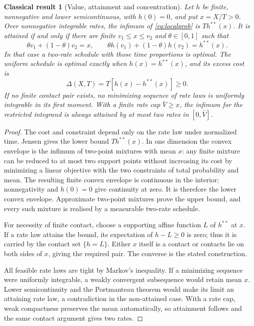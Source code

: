 \documentclass[11pt]{article}
\numberwithin{equation}{section}
\newtheorem{classical}[theorem]{Classical result}
\theoremstyle{definition}
\theoremstyle{remark}
\theoremstyle{definition}
\begin{document}
\begin{classical}[Value, attainment and concentration]\label{thm:relaxation}
Let $h$ be finite, nonnegative and lower semicontinuous, with $h(0)=0$,
and put $x=X/T>0$. Over nonnegative integrable rates, the infimum of
\eqref{eq:localprob} is $Th^{**}(x)$. It is attained if and only if there
are finite $v_1\le x\le v_2$ and $\theta\in[0,1]$ such that
\[
 \theta v_1+(1-\theta)v_2=x,\qquad
 \theta h(v_1)+(1-\theta)h(v_2)=h^{**}(x).
\]
In that case a two-rate schedule with those time proportions is optimal.
The uniform schedule is optimal exactly when $h(x)=h^{**}(x)$, and its
excess cost is
\begin{equation}\label{eq:gap}
 \Delta(X,T)=T[h(x)-h^{**}(x)]\ge0.
\end{equation}
If no finite contact pair exists, no minimizing sequence of rate laws is
uniformly integrable in its first moment. With a finite rate cap
$\bar V\ge x$, the infimum for the restricted integrand is always attained
by at most two rates in $[0,\bar V]$.
\end{classical}
\begin{proof}
The cost and constraint depend only on the rate law under normalized time.
Jensen gives the lower bound $Th^{**}(x)$. In one dimension the convex
envelope is the infimum of two-point mixtures with mean $x$: any finite
mixture can be reduced to at most two support points without increasing its
cost by minimizing a linear objective with the two constraints of total
probability and mean. The resulting finite convex envelope is continuous in
the interior; nonnegativity and $h(0)=0$ give continuity at zero. It is
therefore the lower convex envelope. Approximate two-point mixtures prove the
upper bound, and every such mixture is realised by a measurable two-rate
schedule.

For necessity of finite contact, choose a supporting affine function $L$ of
$h^{**}$ at $x$. If a rate law attains the bound, its expectation of
$h-L\ge0$ is zero; thus it is carried by the contact set $\{h=L\}$.
Either $x$ itself is a contact or contacts lie on both sides of $x$, giving
the required pair. The converse is the stated construction.

All feasible rate laws are tight by Markov's inequality. If a minimizing
sequence were uniformly integrable, a weakly convergent subsequence would
retain mean $x$. Lower semicontinuity and the Portmanteau theorem would make
its limit an attaining rate law, a contradiction in the non-attained case.
With a rate cap, weak compactness preserves the mean automatically, so
attainment follows and the same contact argument gives two rates.
\end{proof}
\end{document}

